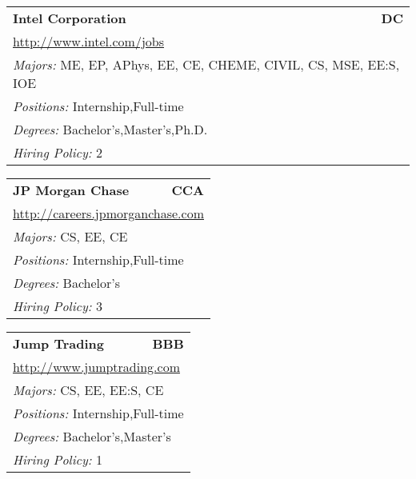 \documentclass[twoside]{article}
\begin{document}
\begin{center}
\begin{multicols}{3}
\begin{FlushLeft}
\begin{minipage}{\columnwidth}
\end{minipage}
 
\begin{minipage}{\columnwidth}\begin{tabularx}{.95\columnwidth}{Xr}
                 {\Large\bf Intel Corporation} & {\Large\bf DC}\\
    \multicolumn{2}{p{.95\columnwidth}}{\url{http://www.intel.com/jobs}}\\
    \multicolumn{2}{p{.95\columnwidth}}{\emph{Majors:} ME, EP, APhys, EE, CE, CHEME, CIVIL, CS, MSE, EE:S, IOE}\\
    \multicolumn{2}{p{.95\columnwidth}}{\emph{Positions:} Internship,Full-time}\\
    \multicolumn{2}{p{.95\columnwidth}}{\emph{Degrees:} Bachelor's,Master's,Ph.D.}\\
    \multicolumn{2}{p{.95\columnwidth}}{\emph{Hiring Policy:} 2}\\
    \end{tabularx}
    
\end{minipage}
 
\begin{minipage}{\columnwidth}\begin{tabularx}{.95\columnwidth}{Xr}
                 {\Large\bf JP Morgan Chase} & {\Large\bf CCA}\\
    \multicolumn{2}{p{.95\columnwidth}}{\url{http://careers.jpmorganchase.com}}\\
    \multicolumn{2}{p{.95\columnwidth}}{\emph{Majors:} CS, EE, CE}\\
    \multicolumn{2}{p{.95\columnwidth}}{\emph{Positions:} Internship,Full-time}\\
    \multicolumn{2}{p{.95\columnwidth}}{\emph{Degrees:} Bachelor's}\\
    \multicolumn{2}{p{.95\columnwidth}}{\emph{Hiring Policy:} 3}\\
    \end{tabularx}
    
\end{minipage}
 
\begin{minipage}{\columnwidth}\begin{tabularx}{.95\columnwidth}{Xr}
                 {\Large\bf Jump Trading} & {\Large\bf BBB}\\
    \multicolumn{2}{p{.95\columnwidth}}{\url{http://www.jumptrading.com}}\\
    \multicolumn{2}{p{.95\columnwidth}}{\emph{Majors:} CS, EE, EE:S, CE}\\
    \multicolumn{2}{p{.95\columnwidth}}{\emph{Positions:} Internship,Full-time}\\
    \multicolumn{2}{p{.95\columnwidth}}{\emph{Degrees:} Bachelor's,Master's}\\
    \multicolumn{2}{p{.95\columnwidth}}{\emph{Hiring Policy:} 1}\\
    \end{tabularx}
    

\end{minipage}
\end{FlushLeft}
\end{multicols}
\end{center}
\end{document}
